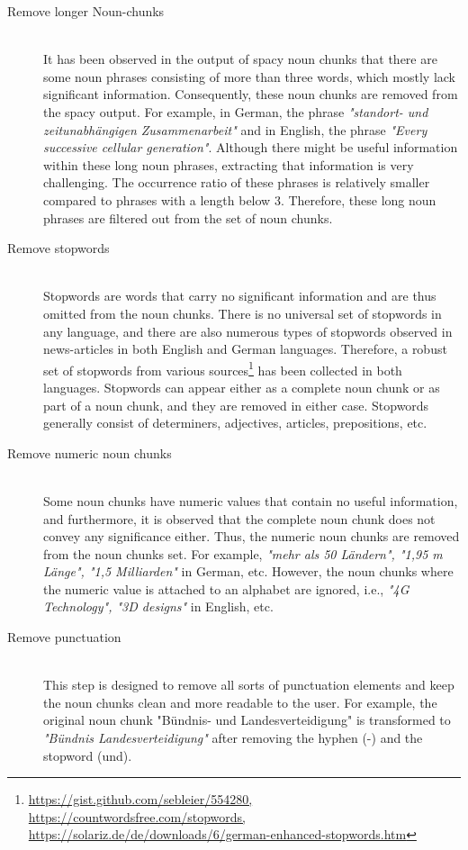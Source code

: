  
 \begin{description}
 	\item[Remove longer Noun-chunks] \hfill \\  It has been observed in the output of spacy noun chunks that there are some  noun phrases consisting of more than three words, which mostly lack significant information. Consequently, these noun chunks are removed from the spacy output. For example, in German, the phrase \emph{"standort- und zeitunabhängigen Zusammenarbeit"} and in English, the phrase \emph{"Every successive cellular generation"}. Although there might be useful information within these long noun phrases, extracting that information is very challenging. The occurrence ratio of these phrases is relatively smaller compared to phrases with a length below 3. Therefore, these long noun phrases are filtered out from the set of noun chunks.
 	
 	\item[Remove stopwords] \hfill \\  Stopwords are words that carry no significant information and are thus omitted from the noun chunks. There is no universal set of stopwords in any language, and there are also numerous types of stopwords observed in news-articles in both English and German languages. Therefore, a robust set of stopwords from various sources\footnote{\url{https://gist.github.com/sebleier/554280, https://countwordsfree.com/stopwords, https://solariz.de/de/downloads/6/german-enhanced-stopwords.htm}} has been collected in both languages. Stopwords can appear either as a complete noun chunk or as part of a noun chunk, and they are removed in either case. Stopwords generally consist of determiners, adjectives, articles, prepositions, etc.
 	
 	
 	\item[Remove numeric noun chunks] \hfill \\  Some noun chunks have numeric values that contain no useful information, and furthermore, it is observed that the complete noun chunk does not convey any significance either. Thus, the numeric noun chunks are removed from the noun chunks set. For example, \emph{"mehr als 50 Ländern", "1,95 m Länge", "1,5 Milliarden"} in German, etc. However, the noun chunks where the numeric value is attached to an alphabet are ignored, i.e., \emph{"4G Technology", "3D designs"} in English, etc.
 	
 	
 	\item[Remove punctuation]  \hfill \\ This step is designed to remove all sorts of punctuation elements and keep the noun chunks clean and more readable to the user. For example, the original noun chunk "Bündnis- und Landesverteidigung" is transformed to \emph{"Bündnis Landesverteidigung"} after removing the hyphen (-) and the stopword (und).
 	

\end{description}
